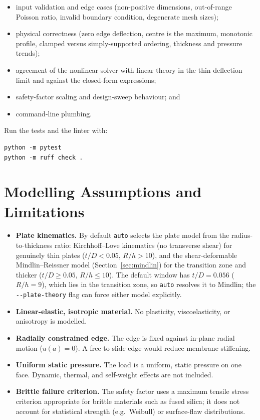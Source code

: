 \documentclass[11pt]{article}
\newcommand{\codeus}{\textunderscore\allowbreak}
\DeclareRobustCommand{\code}[1]{\texttt{\ifmmode\else\renewcommand{\_}{\codeus}\fi#1}}
\begin{document}
\begin{itemize}[noitemsep]
  \item input validation and edge cases (non-positive dimensions, out-of-range
    Poisson ratio, invalid boundary condition, degenerate mesh sizes);
  \item physical correctness (zero edge deflection, centre is the maximum,
    monotonic profile, clamped versus simply-supported ordering, thickness and
    pressure trends);
  \item agreement of the nonlinear solver with linear theory in the thin-deflection
    limit and against the closed-form expressions;
  \item safety-factor scaling and design-sweep behaviour; and
  \item command-line plumbing.
\end{itemize}

Run the tests and the linter with:

\begin{lstlisting}[style=shellstyle]
python -m pytest
python -m ruff check .
\end{lstlisting}

\section{Modelling Assumptions and Limitations}

\begin{itemize}
  \item \textbf{Plate kinematics.} By default \code{auto} selects the plate model
    from the radius-to-thickness ratio: Kirchhoff--Love kinematics (no transverse
    shear) for genuinely thin plates ($t/D < 0.05$, $R/h > 10$), and the
    shear-deformable Mindlin--Reissner model (Section~\ref{sec:mindlin}) for the
    transition zone and thicker ($t/D \ge 0.05$, $R/h \le 10$). The default window
    has $t/D = 0.056$ ($R/h = 9$), which lies in the transition zone, so
    \code{auto} resolves it to Mindlin; the \code{-{}-plate-theory} flag can force
    either model explicitly.
  \item \textbf{Linear-elastic, isotropic material.} No plasticity, viscoelasticity,
    or anisotropy is modelled.
  \item \textbf{Radially constrained edge.} The edge is fixed against in-plane
    radial motion ($u(a)=0$). A free-to-slide edge would reduce membrane
    stiffening.
  \item \textbf{Uniform static pressure.} The load is a uniform, static pressure on
    one face. Dynamic, thermal, and self-weight effects are not included.
  \item \textbf{Brittle failure criterion.} The safety factor uses a maximum
    tensile stress criterion appropriate for brittle materials such as fused
    silica; it does not account for statistical strength (e.g.\ Weibull) or
    surface-flaw distributions.
\end{itemize}
\end{document}
